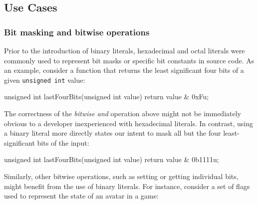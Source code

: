 
\subsection[Use Cases]{Use Cases}\label{use-cases}

\subsubsection[Bit masking and bitwise operations]{Bit masking and bitwise operations}\label{bit-masking-and-bitwise-operations}

Prior to the introduction of binary literals, hexadecimal and octal literals were commonly used to represent bit masks or
specific bit constants in source code.
As an example, consider a
function that returns the least significant four bits of a given
\lstinline!unsigned!~\lstinline!int! value:

\begin{emcppslisting}
unsigned int lastFourBits(unsigned int value)
{
    return value & 0xFu;
}
\end{emcppslisting}


\noindent The correctness of the \emph{bitwise and} operation above might not be
immediately obvious to a developer inexperienced with
hexadecimal literals. In contrast, using a binary literal more directly
states our intent to mask all but the four least-significant bits of the
input:

\begin{emcppslisting}
unsigned int lastFourBits(unsigned int value)
{
    return value & 0b1111u;
}
\end{emcppslisting}



Similarly, other bitwise operations, such as setting or getting
individual bits, might benefit from the use of binary literals. For
instance, consider a set of flags used to represent the state of an
avatar in a game:

